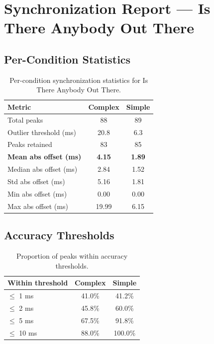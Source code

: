 
\section*{Synchronization Report --- Is There Anybody Out There}

\subsection*{Per-Condition Statistics}

\begin{table}[h!]
\centering
\begin{tabular}{|l|c|c|}
\hline
Metric & Complex & Simple \\
\hline
Total peaks & 88 & 89 \\
Outlier threshold (ms) & 20.8 & 6.3 \\
Peaks retained & 83 & 85 \\
\textbf{Mean abs offset (ms)} & \textbf{4.15} & \textbf{1.89} \\
Median abs offset (ms) & 2.84 & 1.52 \\
Std abs offset (ms) & 5.16 & 1.81 \\
Min abs offset (ms) & 0.00 & 0.00 \\
Max abs offset (ms) & 19.99 & 6.15 \\
\hline
\end{tabular}
\caption{Per-condition synchronization statistics for Is There Anybody Out There.}
\label{tab:sync_stats}
\end{table}

\subsection*{Accuracy Thresholds}

\begin{table}[h!]
\centering
\begin{tabular}{|l|c|c|}
\hline
Within threshold & Complex & Simple \\
\hline
$\leq$ 1 ms & 41.0\% & 41.2\% \\
$\leq$ 2 ms & 45.8\% & 60.0\% \\
$\leq$ 5 ms & 67.5\% & 91.8\% \\
$\leq$ 10 ms & 88.0\% & 100.0\% \\
\hline
\end{tabular}
\caption{Proportion of peaks within accuracy thresholds.}
\label{tab:sync_accuracy}
\end{table}

